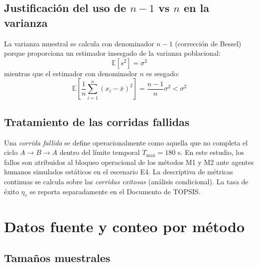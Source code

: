 \documentclass[12pt,a4paper,oneside]{book}
\begin{document}
\subsection{Justificación del uso de $n-1$ vs $n$ en la varianza}

La varianza muestral se calcula con denominador $n-1$ (corrección de Bessel) porque proporciona un estimador insesgado de la varianza poblacional:
\begin{equation}
\mathbb{E}[s^2] = \sigma^2
\end{equation}
mientras que el estimador con denominador $n$ es sesgado:
\begin{equation}
\mathbb{E}\!\left[\frac{1}{n}\sum_{i=1}^{n}(x_i - \bar{x})^2\right] = \frac{n-1}{n}\sigma^2 < \sigma^2
\end{equation}

\subsection{Tratamiento de las corridas fallidas}

Una \emph{corrida fallida} se define operacionalmente como aquella que no completa el ciclo $A\to B\to A$ dentro del límite temporal $T_{\max}=180$ s. En este estudio, los fallos son atribuidos al bloqueo operacional de los métodos M1 y M2 ante agentes humanos simulados estáticos en el escenario E4. La descriptiva de métricas continuas se calcula sobre las \emph{corridas exitosas} (análisis condicional). La tasa de éxito $\eta_s$ se reporta separadamente en el Documento de TOPSIS.

\section{Datos fuente y conteo por método}

\subsection{Tamaños muestrales}
\end{document}
